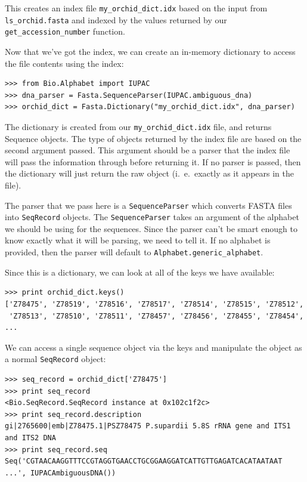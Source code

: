 \documentclass{report}
\begin{document}
This creates an index file \verb|my_orchid_dict.idx| based on the input from \verb|ls_orchid.fasta| and indexed by the values returned by our \verb|get_accession_number| function.


Now that we've got the index, we can create an in-memory dictionary to access the file contents using the index:

\begin{verbatim}
>>> from Bio.Alphabet import IUPAC
>>> dna_parser = Fasta.SequenceParser(IUPAC.ambiguous_dna)
>>> orchid_dict = Fasta.Dictionary("my_orchid_dict.idx", dna_parser)
\end{verbatim} 

The dictionary is created from our \verb|my_orchid_dict.idx| file, and returns Sequence objects. The type of objects returned by the index file are based on the second argument passed. This argument should be a parser that the index file will pass the information through before returning it. If no parser is passed, then the dictionary will just return the raw object (i.~e.~exactly as it appears in the file). 


The parser that we pass here is a \verb|SequenceParser| which converts FASTA files into \verb|SeqRecord| objects. The \verb|SequenceParser| takes an argument of the alphabet we should be using for the sequences. Since the parser can't be smart enough to know exactly what it will be parsing, we need to tell it. If no alphabet is provided, then the parser will default to \verb|Alphabet.generic_alphabet|.


Since this is a dictionary, we can look at all of the keys we have available:

\begin{verbatim}
>>> print orchid_dict.keys()
['Z78475', 'Z78519', 'Z78516', 'Z78517', 'Z78514', 'Z78515', 'Z78512', 
 'Z78513', 'Z78510', 'Z78511', 'Z78457', 'Z78456', 'Z78455', 'Z78454', 
...
\end{verbatim} 

We can access a single sequence object via the keys and manipulate the object as a normal \verb|SeqRecord| object:

\begin{verbatim}
>>> seq_record = orchid_dict['Z78475']
>>> print seq_record
<Bio.SeqRecord.SeqRecord instance at 0x102c1f2c>
>>> print seq_record.description
gi|2765600|emb|Z78475.1|PSZ78475 P.supardii 5.8S rRNA gene and ITS1 and ITS2 DNA
>>> print seq_record.seq
Seq('CGTAACAAGGTTTCCGTAGGTGAACCTGCGGAAGGATCATTGTTGAGATCACATAATAAT ...', IUPACAmbiguousDNA())
\end{verbatim}
\end{document}
